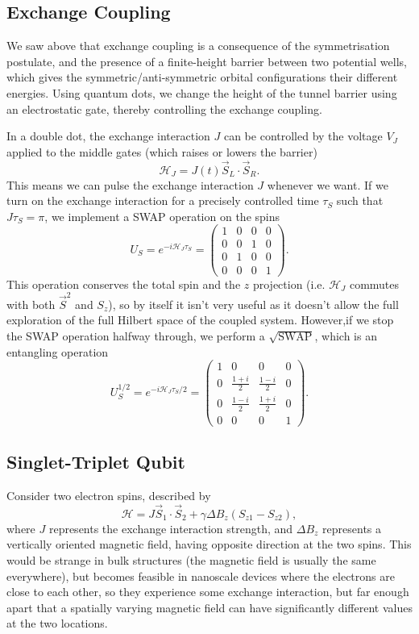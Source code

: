 \documentclass{article}
\begin{document}
\subsection{Exchange Coupling}
We saw above that exchange coupling is a consequence of the symmetrisation postulate, and the presence of a finite-height barrier between two potential wells, which gives the symmetric/anti-symmetric orbital configurations their different energies. Using quantum dots, we change the height of the tunnel barrier using an electrostatic gate, thereby controlling the exchange coupling.

In a double dot, the exchange interaction $J$ can be controlled by the voltage $V_J$ applied to the middle gates (which raises or lowers the barrier) 
\[
    \mathcal{H}_J=J(t)\vec{S}_L \cdot \vec{S}_R.
\]
This means we can pulse the exchange interaction $J$ whenever we want. If we turn on the exchange interaction for a precisely controlled time $\tau _S$ such that $J\tau _S=\pi $, we implement a SWAP operation on the spins 
\[
    U_S=e^{-i \mathcal{H}_J\tau _S}=\begin{pmatrix}
        1&0&0&0\\
        0&0&1&0\\
        0&1&0&0\\
        0&0&0&1
    \end{pmatrix}.
\]
This operation conserves the total spin and the $z$ projection (i.e. $\mathcal{H}_J$ commutes with both $\vec{S}^2$ and $S_z$), so by itself it isn't very useful as it doesn't allow the full exploration of the full Hilbert space of the coupled system. However,if we stop the SWAP operation halfway through, we perform a $\sqrt{\text{SWAP}}$, which is an entangling operation 
\[
    U_S^{1/2}=e^{-i \mathcal{H}_J \tau _S/2}=\begin{pmatrix}
        1&0&0&0\\
        0&\frac{1+i}{2}&\frac{1-i}{2}&0\\
        0&\frac{1-i}{2}&\frac{1+i}{2}&0\\
        0&0&0&1
    \end{pmatrix}.
\]

\subsection{Singlet-Triplet Qubit}
Consider two electron spins, described by 
\[
    \mathcal{H}=J\vec{S}_1 \cdot \vec{S}_2+\gamma \Delta B_z \left( S_{z1}-S_{z2} \right),
\]
where $J$ represents the exchange interaction strength, and $\Delta B_z$ represents a vertically oriented magnetic field, having opposite direction at the two spins. This would be strange in bulk structures (the magnetic field is usually the same everywhere), but becomes feasible in nanoscale devices where the electrons are close to each other, so they experience some exchange interaction, but far enough apart that a spatially varying magnetic field can have significantly different values at the two locations.
\end{document}
